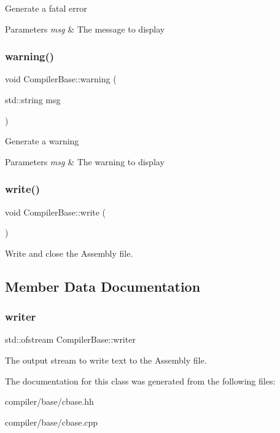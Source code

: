 Generate a fatal error


\begin{DoxyParams}{Parameters}
{\em msg} & The message to display \\
\hline
\end{DoxyParams}
\mbox{\label{classCompilerBase_a5071a080216879535460939393c59282}} 
\subsubsection{\texorpdfstring{warning()}{warning()}}
{\footnotesize\ttfamily void Compiler\+Base\+::warning (\begin{DoxyParamCaption}\item[{std\+::string}]{msg }\end{DoxyParamCaption})\hspace{0.3cm}{\ttfamily [protected]}}

Generate a warning


\begin{DoxyParams}{Parameters}
{\em msg} & The warning to display \\
\hline
\end{DoxyParams}
\mbox{\label{classCompilerBase_a064f1b7fae8680de3fa9bc5c2731c6c6}} 
\subsubsection{\texorpdfstring{write()}{write()}}
{\footnotesize\ttfamily void Compiler\+Base\+::write (\begin{DoxyParamCaption}{ }\end{DoxyParamCaption})}

Write and close the Assembly file. 

\subsection{Member Data Documentation}
\mbox{\label{classCompilerBase_a27c46d3aaf3505d4efa2183f05b906bb}} 
\subsubsection{\texorpdfstring{writer}{writer}}
{\footnotesize\ttfamily std\+::ofstream Compiler\+Base\+::writer\hspace{0.3cm}{\ttfamily [protected]}}

The output stream to write text to the Assembly file. 

The documentation for this class was generated from the following files\+:\begin{DoxyCompactItemize}
\item 
compiler/base/cbase.\+hh\item 
compiler/base/cbase.\+cpp\end{DoxyCompactItemize}
